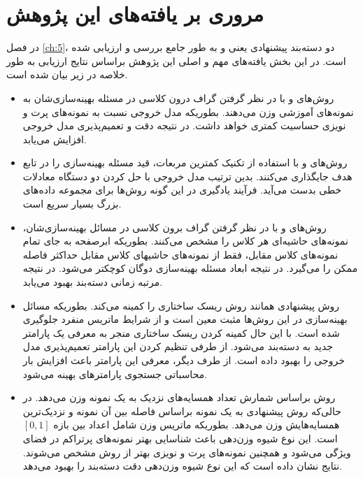 \section{مروری بر یافته‌های این پژوهش}\label{sec:6:3}
در فصل \ref{ch:5}، دو دسته‌بند پیشنهادی یعنی  و  به طور جامع بررسی و ارزیابی شده است. در این بخش یافته‌های مهم و اصلی این پژوهش براساس نتایج ارزیابی به طور خلاصه در زیر بیان شده است.
\begin{itemize}[label=$\bullet$]
	\item روش‌های   و   با در نظر گرفتن گراف درون کلاسی در مسئله بهینه‌سازی‌شان به نمونه‌های آموزشی وزن می‌دهند. بطوریکه مدل خروجی نسبت به نمونه‌های پرت و نویزی حساسیت کمتری خواهد داشت. در نتیجه دقت و تعمیم‌پذیری مدل خروجی افزایش می‌یابد.
	\item روش‌های   و   با استفاده از تکنیک کمترین مربعات، قید مسئله بهینه‌سازی را در تابع هدف جایگذاری می‌کنند. بدین ترتیب مدل خروجی با حل کردن دو دستگاه معادلات خطی بدست می‌آید. فرآیند یادگیری در این گونه روش‌ها برای مجموعه داده‌های بزرگ بسیار سریع است.
	\item روش‌های  و   با در نظر گرفتن گراف برون کلاسی در مسائل بهینه‌سازی‌شان، نمونه‌های حاشیه‌ای هر کلاس را مشخص می‌کنند. بطوریکه ابرصفحه به جای تمام نمونه‌های کلاس مقابل، فقط از نمونه‌های حاشیها‌‌‌ی کلاس مقابل حداکثر فاصله ممکن را می‌گیرد. در نتیجه ابعاد مسئله بهینه‌سازی دوگان کوچکتر می‌شود. در نتیجه مرتبه زمانی دسته‌بند بهبود می‌یابد.
	\item روش پیشنهادی   همانند روش   ریسک ساختاری را کمینه می‌کند. بطوریکه مسائل بهینه‌سازی در این  روش‌ها مثبت معین است و از شرایط ماتریس منفرد جلوگیری شده است. با این حال کمینه کردن ریسک ساختاری منجر به معرفی یک پارامتر جدید به دسته‌بند می‌شود. از طرفی تنظیم کردن این پارامتر تعمیم‌پذیری مدل خروجی را بهبود داده است. از طرف دیگر، معرفی این پارامتر باعث افزایش بار محاسباتی جستجوی پارامترهای بهینه می‌شود. 
	\item روش   براساس شمارش تعداد همسایه‌های نزدیک به یک نمونه وزن می‌دهد. در حالی‌که روش پیشنهادی   به یک نمونه براساس فاصله بین آن نمونه و نزدیک‌ترین همسایه‌هایش وزن می‌دهد. بطوریکه ماتریس وزن شامل اعداد بین بازه   $\left[0,1\right]$ است. این نوع شیوه وزن‌دهی باعث شناسایی بهتر نمونه‌های پرتراکم در فضای ویژگی می‌شود و همچنین نمونه‌های پرت و نویزی بهتر از روش  مشخص می‌شوند. نتایج نشان داده است که این نوع شیوه وزن‌دهی دقت دسته‌بند  را بهبود می‌دهد.
\end{itemize}

